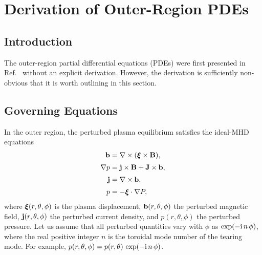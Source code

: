 \documentclass[12pt,prb,aps]{revtex4-1}
\newcommand {\bxi}{\mbox{\boldmath$\xi$}}
\begin{document}
\section{Derivation of Outer-Region PDEs}
\subsection{Introduction}
The outer-region partial differential equations (PDEs) were first presented in Ref.~ without an explicit
derivation. However, the derivation is sufficiently non-obvious that it is worth outlining in this section. 

\subsection{Governing Equations}\label{mhd}
In the outer region, the perturbed plasma equilibrium satisfies the  ideal-MHD equations\,\cite{connor,am1,am3,gs1}
\begin{align}
{\bf b} &= \nabla\times (\bxi\times {\bf B}),\label{e21}\\[0.5ex]
\nabla p &={\bf j}\times {\bf B}  +{\bf J}\times {\bf b},\label{e22}\\[0.5ex]
{\bf j} &= \nabla\times {\bf b},\label{e23}\\[0.5ex]
p&= -\bxi\cdot\nabla P,\label{e24}
\end{align}
where $\bxi(r,\theta,\phi)$ is the plasma displacement, ${\bf b}(r,\theta,\phi)$ the perturbed magnetic field,
${\bf j}(r,\theta,\phi)$ the perturbed current density, and $p(r,\theta,\phi)$ the perturbed pressure. 
Let us assume that all perturbed quantities vary with $\phi$ as $\exp(-{\rm i}\,n\,\phi)$, where the real positive integer $n$ is the
toroidal mode number of the tearing mode. For example, $p(r,\theta,\phi) = p(r,\theta)\,\exp(-{\rm i}\,n\,\phi)$. 
\end{document}
